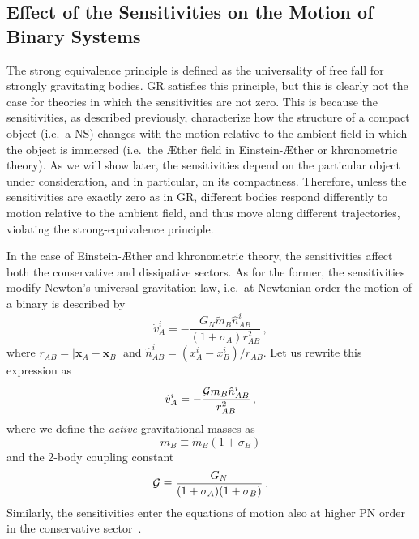 \documentclass[prd,aps,twocolumn,nofootinbib,showpacs,superscriptaddress]{revtex4-1}
\newcommand\be{\begin{equation}}
\newcommand\ee{\end{equation}}
\begin{document}
\subsection{Effect of the Sensitivities on the Motion of Binary Systems}
\label{sec:cons-sect}

The strong equivalence principle is defined as the universality of free fall for strongly gravitating bodies. GR satisfies this principle, but this is clearly not the case for theories in which the sensitivities are not zero. This is because
the sensitivities, as described previously, characterize how the structure of
a compact object (i.e.~a NS) changes with the motion relative to the ambient field in which the object
is immersed (i.e.~the \AE ther field in Einstein-\AE ther or khronometric theory). As we will show later, the sensitivities depend on the particular object under consideration, 
and in particular, on its compactness. Therefore, unless the sensitivities are exactly zero as in GR, different bodies
respond differently to  motion relative to the ambient field, and thus move along different trajectories, 
violating the strong-equivalence principle. 

In the case of Einstein-\AE ther and khronometric theory, the sensitivities affect
both the conservative and dissipative sectors. 
As for the former, the sensitivities modify Newton's universal gravitation law, i.e.~at Newtonian
order the motion of a binary is described by~\cite{Foster:2007gr}
\begin{equation}
\label{Newtonian-a}
\dot{v}_A^i= -\frac{G_N \tilde{m}_B \hat n_{AB}^i}{(1+\sigma_A) r_{AB}^2}\,,
\end{equation}
where $r_{AB}=|\boldsymbol{x}_A-\boldsymbol{x}_B|$ and $\hat n_{AB}^i=(x^i_A-x^i_B)/r_{AB}$.
Let us rewrite this expression as~\cite{Foster:2007gr}
\begin{equation}
\label{eq:New_active}
\dot{v}_A^i= -\frac{{\cal G} {m}_B \hat n_{AB}^i}{r_{AB}^2}\,,
\end{equation}
where we define the {\textit{active}} gravitational masses as
\be
\label{active-mass}
m_B\equiv\tilde{m}_B (1+\sigma_B)
\ee
and the 2-body coupling constant
\be
\label{calG}
{\cal G}\equiv\frac{G_N}{(1+\sigma_A) (1+\sigma_B)}\,.
\ee
Similarly, the sensitivities enter the equations of motion also at higher PN order in the conservative sector~\cite{Foster:2007gr}.
\end{document}

